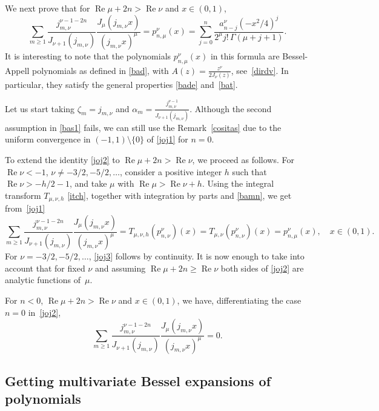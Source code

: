 \documentclass[12pt,leqno]{amsart}
\numberwithin{equation}{section}
\theoremstyle{plain}
\renewcommand{\Re}{\operatorname{Re}}
\begin{document}
We next prove that for $\Re \mu+2n>\Re \nu$ and $x\in (0,1)$,
\begin{equation}
\label{joj2}
\sum_{m\ge 1} \frac{j_{m,\nu}^{\nu-1-2n}}{J_{\nu+1}(j_{m,\nu})} 
\frac{J_{\mu}(j_{m,\nu}x)}{(j_{m,\nu}x)^{\mu}} 
= p_{n,\mu}^{\nu}(x)
= \sum_{j=0}^n\frac{a^\nu_{n-j}(-x^{2}/4)^j}{2^{\mu}j!\,\Gamma(\mu+j+1)}.
\end{equation}
It is interesting to note that the polynomials $p_{n,\mu}^{\nu}(x)$ in this formula are Bessel-Appell polynomials as defined in \eqref{bad}, with $A(z) = \frac{z^\nu}{2J_{\nu}(z)}$, see~\eqref{dirdv}. In particular, they satisfy the general properties \eqref{bade} and~\eqref{bat}.

Let us start taking $\zeta_m=j_{m,\nu}$ and $\alpha_m= \frac{j_{m,\nu}^{\nu-1}}{J_{\nu+1}(j_{m,\nu})}$. Although the second assumption in \eqref{bas1} fails, we can still use the Remark~\ref{cositas} due to the uniform convergence in $(-1,1)\setminus\{0\}$ of \eqref{joj1} for $n=0$. 

To extend the identity \eqref{joj2} to $\Re \mu+2n>\Re \nu$, we proceed as follows.
For $\Re \nu<-1$, $\nu\not =-3/2, -5/2,\dots$, consider a positive integer $h$ such that $\Re\nu>-h/2-1$, and take $\mu$ with $\Re\mu>\Re \nu+h$. Using the integral transform $T_{\mu,\nu,h}$ \eqref{itch}, together with integration by parts and \eqref{bamn}, we get from~\eqref{joj1}
\begin{equation}
\label{joj3}
\sum_{m\ge 1} \frac{j_{m,\nu}^{\nu-1-2n}}{J_{\nu+1}(j_{m,\nu})} \frac{J_{\mu}(j_{m,\nu}x)}
{(j_{m,\nu}x)^{\mu}}
= T_{\mu,\nu,h}(p_{n,\nu}^{\nu})(x) = T_{\mu,\nu}(p_{n,\nu}^{\nu})(x)
= p_{n,\mu}^{\nu}(x), \quad x\in (0,1).
\end{equation}
For $\nu=-3/2, -5/2,\dots$, \eqref{joj3} follows by continuity.
It is now enough to take into account that for fixed $\nu$ and assuming $\Re\mu+2n\ge \Re \nu$ both sides of \eqref{joj2} are analytic functions of~$\mu$.

For $n<0$, $\Re \mu+2n>\Re \nu$ and $x\in (0,1)$, we have, differentiating the case $n=0$ in~\eqref{joj2},
\begin{equation*}
\sum_{m\ge 1} \frac{j_{m,\nu}^{\nu-1-2n}}{J_{\nu+1}(j_{m,\nu})} \frac{J_{\mu}(j_{m,\nu}x)}
{(j_{m,\nu}x)^{\mu}}= 0.
\end{equation*}

\subsection{Getting multivariate Bessel expansions of polynomials}
\label{subsec:Bespol}
\end{document}

